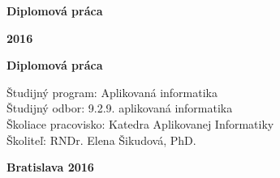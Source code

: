 \begin{center}
\centerline{\Large\sc\textbf\skola}
\sc\Large\textbf\fakulta
\end{center}

\vspace*{8cm}

\begin{center}
\begin{minipage}{0.8\textwidth}
\begin{center}
 \LARGE\sc\textbf\nazov
 \vspace{1em}
 \centerline{\Large\bf Diplomová práca}
\end{center}
\end{minipage}
\end{center}

\vfill
\noindent
 {\bf 2016}  \hfill {\bf \autor}
\thispagestyle{empty}



\newpage
\begin{center}
\centerline{\Large\sc\textbf\skola}
\sc\Large\textbf\fakulta
\end{center}

\vspace*{8cm}

\begin{center}
\begin{minipage}{0.8\textwidth}
\begin{center}
 \LARGE\sc\textbf\nazov
\end{center}
\vspace{1em}
\centerline{\Large\bf Diplomová práca}
\end{minipage}
\end{center}

\vspace{5cm}

\linespread{1.3}%
\selectfont

\noindent
Študijný program: \hspace{0.8em} Aplikovaná informatika\\
Študijný odbor:  \hspace{1.85em} 9.2.9. aplikovaná informatika\\
Školiace pracovisko: Katedra Aplikovanej Informatiky\\
Školiteľ:  \hspace{4.6em} RNDr. Elena Šikudová, PhD.


\vfill
\noindent
{\bf Bratislava 2016}  \hfill {\bf \autor}
\thispagestyle{empty}

